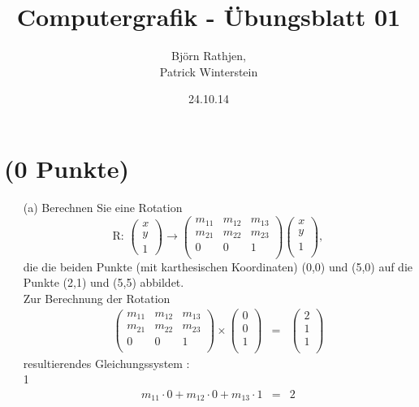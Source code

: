 \documentclass[11pt]{article}
\title{Computergrafik - Übungsblatt 01}
\author{Björn Rathjen,\\Patrick Winterstein}
\date{24.10.14}
\begin{document}
\maketitle
\newpage
\section{(0 Punkte)}
\begin{enumerate}
\item[(a)]Berechnen Sie eine Rotation
$$ \text{R: } \begin{pmatrix}
x \\ y \\ 1
\end{pmatrix} \rightarrow \begin{pmatrix}
m_{11} & m_{12} & m_{13} \\
m_{21} & m_{22} & m_{23} \\
0 & 0 & 1 \\
\end{pmatrix} \begin{pmatrix}
x \\ y \\ 1 \\
\end{pmatrix}, $$
die die beiden Punkte (mit karthesischen Koordinaten) (0,0) und (5,0) auf die Punkte (2,1) und (5,5) abbildet.\\
Zur Berechnung der Rotation  
\begin{eqnarray*}
\begin{pmatrix}
m_{11} & m_{12} & m_{13} \\
m_{21} & m_{22} & m_{23} \\
0 & 0 & 1 \\
\end{pmatrix}
\times
\begin{pmatrix}
0 \\ 0 \\ 1 \\
\end{pmatrix}
&=&
\begin{pmatrix}
2 \\ 1 \\ 1 \\
\end{pmatrix}
\end{eqnarray*}
resultierendes Gleichungssystem : \\
1
\begin{eqnarray*}
m_{11} \cdot 0 + m_{12} \cdot 0 + m_{13} \cdot 1  &=& 2 \\

\end{eqnarray*}
\end{enumerate}
\end{document}
